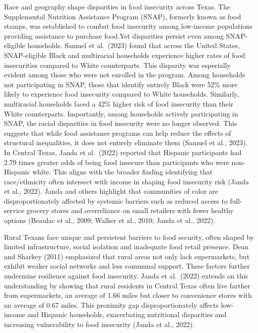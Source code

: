 \documentclass[
]{article}
\begin{document}
Race and geography shape disparities in food insecurity across Texas.
The Supplemental Nutrition Assistance Program (SNAP), formerly known as
food stamps, was established to combat food insecurity among low-income
populations providing assistance to purchase food.Yet disparities
persist even among SNAP-eligible households. Samuel et al.~(2023) found
that across the United States, SNAP-eligible Black and multiracial
households experience higher rates of food insecurities compared to
White counterparts. This disparity was especially evident among those
who were not enrolled in the program. Among households not participating
in SNAP, those that identify entirely Black were 52\% more likely to
experience food insecurity compared to White households. Similarly,
multiracial households faced a 42\% higher risk of food insecurity than
their White counterparts. Importantly, among households actively
participating in SNAP, the racial disparities in food insecurity were no
longer observed. This suggests that while food assistance programs can
help reduce the effects of structural inequalities, it does not entirely
eliminate them (Samuel et al., 2023). In Central Texas, Janda et
al.~(2022) reported that Hispanic participants had 2.79 times greater
odds of being food insecure than participants who were non-Hispanic
white. This aligns with the broader finding identifying that
race/ethnicity often intersect with income in shaping food insecurity
risk (Janda et al., 2022). Janda and others highlight that communities
of color are disproportionately affected by systemic barriers such as
reduced access to full-service grocery stores and overreliance on small
retailers with fewer healthy options (Beaulac et al., 2009; Walker et
al., 2010; Janda et al., 2022).

Rural Texans face unique and persistent barriers to food security, often
shaped by limited infrastructure, social isolation and inadequate food
retail presence. Dean and Sharkey (2011) emphasized that rural areas not
only lack supermarkets, but exhibit weaker social networks and less
communal support. These factors further undermine resilience against
food insecurity. Janda et al.~(2022) extends on this understanding by
showing that rural residents in Central Texas often live farther from
supermarkets, an average of 1.66 miles but closer to convenience stores
with an average of 0.67 miles. This proximity gap disproportionately
affects low-income and Hispanic households, exacerbating nutritional
disparities and increasing vulnerability to food insecurity (Janda et
al., 2022).
\end{document}
